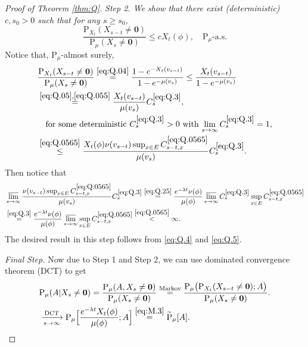 \documentclass[12pt,a4paper]{amsart}
\numberwithin{equation}{section}
\theoremstyle{plain}
\theoremstyle{definition}
\theoremstyle{remark}
\begin{document}
\begin{proof}[Proof of Theorem \ref{thm:Q}]
\emph{
	Step 2. We show that there exist (deterministic) $c,s_0>0$ such that for any $s\geq s_0$,
	\begin{equation} \label{eq:Q.2}
		\frac{\mathrm P_{X_t}(X_{s-t} \neq \mathbf 0)}{\mathrm P_\mu(X_{s} \neq \mathbf 0)}
		\leq cX_t(\phi), \quad \mathrm P_\mu\text{-a.s.}
	\end{equation}
}
	Notice that, $\mathrm P_\mu$-almost surely,
	\begin{align}
		& \frac{\mathrm P_{X_t}(X_{s-t}\neq \mathbf 0)}{\mathrm P_\mu(X_s\neq \mathbf 0)}
		\overset{\eqref{eq:Q.04}}= \frac{1-e^{- X_t(v_{s-t}) }}{1-e^{- \mu(v_s) }}
		\leq \frac{X_t(v_{s-t}) }{1-e^{- \mu(v_s) }}
		\\\label{eq:Q.3}&\overset{\eqref{eq:Q.05},\eqref{eq:Q.055}}= \frac{X_t(v_{s-t}) }{ \mu(v_s)} C_s^{\eqref{eq:Q.3}},
		\\& \quad \text{for some deterministic $C_s^{\eqref{eq:Q.3}}>0$ with $\lim_{s\to \infty} C_s^{\eqref{eq:Q.3}} = 1$,}
		\\\label{eq:Q.4}&\overset{\eqref{eq:Q.0565}}\leq \frac{X_t(\phi) \nu(v_{s-t}) \sup_{x\in E} C_{s-t,x}^{\eqref{eq:Q.0565}}}{ \mu(v_s)} C_s^{\eqref{eq:Q.3}}.
	\end{align}
	Then notice that
	\begin{align}
		&  \varlimsup_{s\to \infty}\frac{\nu(v_{s-t}) \sup_{x\in E} C_{s-t,x}^{\eqref{eq:Q.0565}}}{ \mu(v_s)} C_s^{\eqref{eq:Q.3}}
		\overset{\eqref{eq:Q.25}} = \frac{e^{-\lambda t} \nu(\phi)}{\mu(\phi)} \varlimsup_{s\to \infty}C_s^{\eqref{eq:Q.3}} \sup_{x\in E}C_{s-t,x}^{\eqref{eq:Q.0565}}
		\\\label{eq:Q.5}&\overset{\eqref{eq:Q.3}} = \frac{e^{-\lambda t} \nu(\phi)}{\mu(\phi)} \varlimsup_{s\to \infty} \sup_{x\in E}C_{s-t,x}^{\eqref{eq:Q.0565}}
		\overset{\eqref{eq:Q.0565}}< \infty.
	\end{align}
	The desired result in this step follows from \eqref{eq:Q.4} and \eqref{eq:Q.5}. 
	
	\emph{Final Step.} Now due to Step 1 and Step 2, we can use dominated convergence theorem (DCT) to get
\begin{align}
&  \mathrm P_\mu(A|X_s\neq \mathbf 0)
	=\frac{\mathrm P_\mu(A, X_s \neq \mathbf 0)}{\mathrm P_\mu(X_s\neq \mathbf 0)}
	\overset{\text{Markov}}=\frac{\mathrm P_\mu\big(\mathrm P_{X_t}(X_{s-t} \neq \mathbf 0);A\big)}{\mathrm P_\mu(X_s\neq \mathbf 0)}.
	\\&\xrightarrow[s\to \infty]{\text{DCT}} \mathrm P_\mu\Big[\frac{e^{-\lambda t}X_t(\phi)}{\mu(\phi) }; A\Big]
	\overset{\eqref{eq:M.3}} = \widetilde{\mathrm P}_\mu[A].
	\qedhere
\end{align}
\end{proof}
\end{document}
